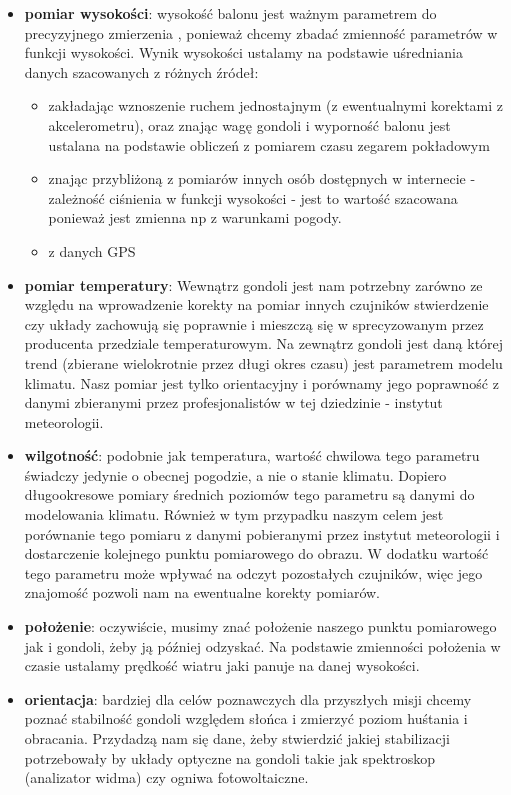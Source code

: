 \documentclass[a4paper,12pt]{article}
\begin{document}
\begin{itemize}
\item \textbf{pomiar wysokości}: wysokość balonu jest ważnym parametrem do precyzyjnego zmierzenia , ponieważ chcemy zbadać zmienność parametrów w funkcji wysokości. Wynik wysokości ustalamy na podstawie uśredniania danych szacowanych z różnych źródeł:
\begin{itemize}
 \item zakładając wznoszenie ruchem jednostajnym (z ewentualnymi korektami z akcelerometru), oraz znając wagę gondoli i wyporność balonu jest ustalana na podstawie obliczeń z pomiarem czasu zegarem pokładowym
 \item znając przybliżoną z pomiarów innych osób dostępnych w internecie - zależność ciśnienia w funkcji wysokości - jest to wartość szacowana ponieważ jest zmienna np z warunkami pogody.
\item z danych GPS%
\end{itemize}
\item \textbf{pomiar temperatury}: Wewnątrz gondoli jest nam potrzebny zarówno ze względu na wprowadzenie korekty na pomiar innych czujników stwierdzenie czy układy zachowują się poprawnie i mieszczą się w sprecyzowanym przez producenta przedziale temperaturowym. Na zewnątrz gondoli jest daną której trend (zbierane wielokrotnie przez długi okres czasu)  jest parametrem modelu klimatu. Nasz pomiar jest tylko orientacyjny i porównamy jego poprawność z danymi zbieranymi przez profesjonalistów w tej dziedzinie - instytut meteorologii.
\item \textbf{wilgotność}: podobnie jak temperatura, wartość chwilowa tego parametru świadczy jedynie o obecnej pogodzie, a nie o stanie klimatu. Dopiero długookresowe pomiary średnich poziomów tego parametru są danymi do modelowania klimatu. Również w tym przypadku naszym celem jest porównanie tego pomiaru z danymi pobieranymi przez instytut meteorologii i dostarczenie kolejnego punktu pomiarowego do obrazu. W dodatku wartość tego parametru może wpływać na odczyt pozostałych czujników, więc jego znajomość pozwoli nam na ewentualne korekty pomiarów.
\item \textbf{położenie}: oczywiście, musimy znać położenie naszego punktu pomiarowego jak i gondoli, żeby ją później odzyskać. Na podstawie zmienności położenia w czasie ustalamy prędkość wiatru jaki panuje na danej wysokości.
\item \textbf{orientacja}: bardziej dla celów poznawczych dla przyszłych misji chcemy poznać stabilność gondoli względem słońca i zmierzyć poziom huśtania i obracania. Przydadzą nam się dane, żeby stwierdzić jakiej stabilizacji potrzebowały by układy optyczne na gondoli takie jak spektroskop (analizator widma) czy ogniwa fotowoltaiczne.
\end{itemize}
\end{document}
